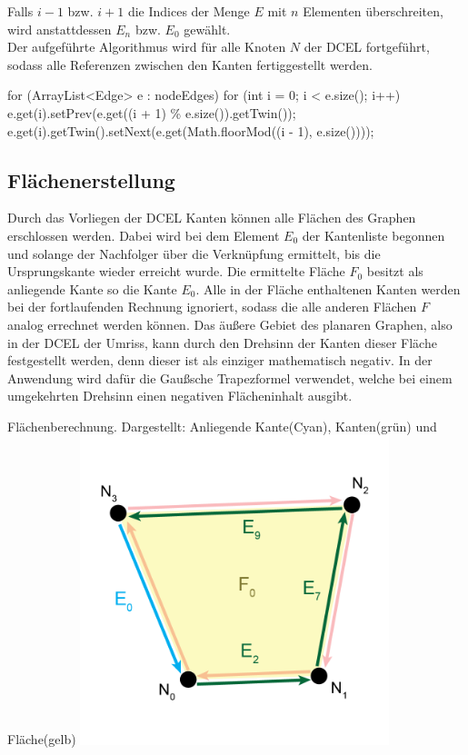 Falls $i-1$ bzw. $i+1$ die Indices der Menge $E$ mit $n$ Elementen überschreiten, wird anstattdessen $E_n$ bzw. $E_0$ gewählt. \\
Der aufgeführte Algorithmus wird für alle Knoten $N$ der DCEL fortgeführt, sodass alle Referenzen zwischen den Kanten fertiggestellt werden. 
\begin{code}
	for (ArrayList<Edge> e : nodeEdges) {
		for (int i = 0; i < e.size(); i++) {
			e.get(i).setPrev(e.get((i + 1) \% e.size()).getTwin());
			e.get(i).getTwin().setNext(e.get(Math.floorMod((i - 1), e.size())));
		}
	}
\end{code}

\subsection{Flächenerstellung}
Durch das Vorliegen der DCEL Kanten können alle Flächen des Graphen erschlossen werden.
Dabei wird bei dem Element $E_0$ der Kantenliste begonnen und solange der Nachfolger über die Verknüpfung ermittelt, bis die Ursprungskante wieder erreicht wurde.
Die ermittelte Fläche $F_0$ besitzt als anliegende Kante so die Kante $E_0$.
Alle in der Fläche enthaltenen Kanten werden bei der fortlaufenden Rechnung ignoriert, sodass die alle anderen Flächen $F$ analog errechnet werden können.
Das äußere Gebiet des planaren Graphen, also in der DCEL der Umriss, kann durch den Drehsinn der Kanten dieser Fläche festgestellt werden, denn dieser ist als einziger mathematisch negativ.
In der Anwendung wird dafür die Gaußsche Trapezformel verwendet, welche bei einem umgekehrten Drehsinn einen negativen Flächeninhalt ausgibt.

\begin{Bild}{Flächenberechnung. Dargestellt: Anliegende Kante(Cyan), Kanten(grün) und Fläche(gelb)}
	\includegraphics[width = 90mm]{Bilder/FlaecheBerechnung}
\end{Bild}

